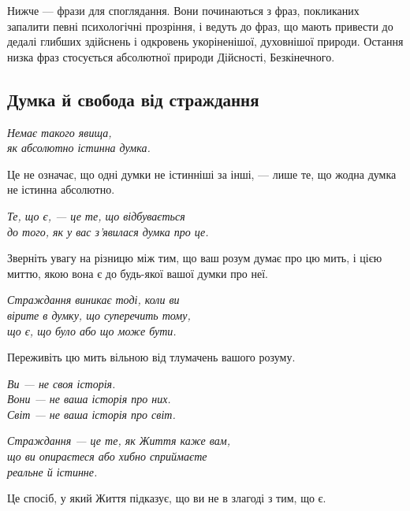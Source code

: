 Нижче — фрази для споглядання. Вони починаються з фраз, покликаних запалити певні психологічні прозріння, і ведуть до фраз, що мають привести до дедалі глибших здійснень і одкровень укоріненішої, духовнішої природи. Остання низка фраз стосується абсолютної природи Дійсності, Безкінечного.

\subsection*{Думка й свобода від страждання}

\begin{center}\itshape
Немає такого явища,\\
як абсолютно істинна думка.
\end{center}

Це не означає, що одні думки не істинніші за інші, — лише те, що жодна думка не істинна абсолютно.

\begin{center}\itshape
Те, що є, — це те, що відбувається\\
до того, як у вас з'явилася думка про це.
\end{center}

Зверніть увагу на різницю між тим, що ваш розум думає про цю мить, і цією миттю, якою вона є до будь-якої вашої думки про неї.

\begin{center}\itshape
Страждання виникає тоді, коли ви\\
вірите в думку, що суперечить тому,\\
що є, що було або що може бути.
\end{center}

Переживіть цю мить вільною від тлумачень вашого розуму.

\begin{center}\itshape
Ви — не своя історія.\\
Вони — не ваша історія про них.\\
Світ — не ваша історія про світ.
\end{center}

\begin{center}\itshape
Страждання — це те, як Життя каже вам,\\
що ви опираєтеся або хибно сприймаєте\\
реальне й істинне.
\end{center}

Це спосіб, у який Життя підказує, що ви не в злагоді з тим, що є.

